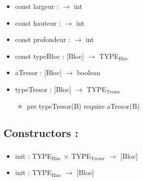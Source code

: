 \documentclass[11pt]{article}
\begin{document}
\begin{itemize}

\item const largeur : $\to$ int\\
\label{sec-1.4.1.1}


\item const hauteur : $\to$ int\\
\label{sec-1.4.1.2}


\item const profondeur : $\to$ int\\
\label{sec-1.4.1.3}


\item const typeBloc : [Bloc]  $\to$ TYPE$_{\mathrm{Bloc}}$\\
\label{sec-1.4.1.4}


\item aTresor : [Bloc]  $\to$ boolean\\
\label{sec-1.4.1.5}


\item typeTresor : [Bloc]  $\to$ TYPE$_{\mathrm{Tresor}}$\\
\label{sec-1.4.1.6}

\begin{itemize}

\item pre typeTresor(B) require aTresor(B)\\
\label{sec-1.4.1.6.1}


\end{itemize} %
\end{itemize} %
\subsection{Constructors :}
\label{sec-1.5}

\subsubsection{}

\begin{itemize}

\item init : TYPE$_{\mathrm{Bloc}}$ $\times$ TYPE$_{\mathrm{Tresor}}$ $\to$ [Bloc]\\
\label{sec-1.5.1.1}


\item init : TYPE$_{\mathrm{Bloc}}$ $\to$ [Bloc]\\
\label{sec-1.5.1.2}


\end{itemize} %
\end{document}
